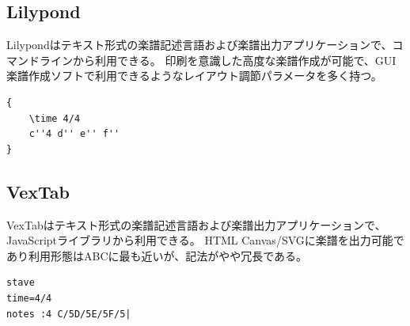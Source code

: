 \subsection{Lilypond}
Lilypond\cite{Lily}はテキスト形式の楽譜記述言語および楽譜出力アプリケーションで、コマンドラインから利用できる。
印刷を意識した高度な楽譜作成が可能で、GUI楽譜作成ソフトで利用できるようなレイアウト調節パラメータを多く持つ。
\begin{lstlisting}[caption=Lilypondにおける図\ref{cdef}の楽譜の記述例, label=lily]
{
    \time 4/4
    c''4 d'' e'' f''
}
\end{lstlisting}

\subsection{VexTab}
VexTab\cite{Vex}はテキスト形式の楽譜記述言語および楽譜出力アプリケーションで、JavaScriptライブラリから利用できる。
HTML Canvas/SVGに楽譜を出力可能であり利用形態はABCに最も近いが、記法がやや冗長である。
\begin{lstlisting}[caption=VexTabにおける図\ref{cdef}の楽譜の記述例, label=vex]
stave
time=4/4
notes :4 C/5D/5E/5F/5|
\end{lstlisting}


